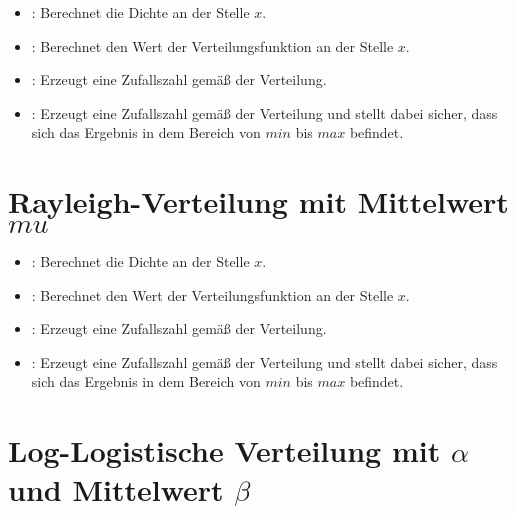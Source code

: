 \begin{itemize}

\item
{}:
Berechnet die Dichte an der Stelle $x$.

\item
{}:
Berechnet den Wert der Verteilungsfunktion an der Stelle $x$.

\item
{}:
Erzeugt eine Zufallszahl gemäß der Verteilung.

\item
{}:
Erzeugt eine Zufallszahl gemäß der Verteilung und stellt dabei sicher, dass sich das Ergebnis in dem Bereich von $min$ bis $max$ befindet.

\end{itemize}



\section{Rayleigh-Verteilung mit Mittelwert \texorpdfstring{$mu$}{mu}}

\begin{itemize}

\item
{}:
Berechnet die Dichte an der Stelle $x$.

\item
{}:
Berechnet den Wert der Verteilungsfunktion an der Stelle $x$.

\item
{}:
Erzeugt eine Zufallszahl gemäß der Verteilung.

\item
{}:
Erzeugt eine Zufallszahl gemäß der Verteilung und stellt dabei sicher, dass sich das Ergebnis in dem Bereich von $min$ bis $max$ befindet.

\end{itemize}



\section{Log-Logistische Verteilung mit \texorpdfstring{$\alpha$}{alpha} und Mittelwert \texorpdfstring{$\beta$}{beta}}

